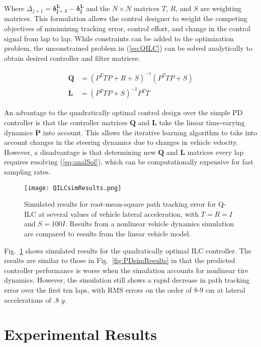 \documentclass[letterpaper, 10 pt, conference]{ieeeconf}  %
\begin{document}
Where $\Delta_{j\!+\!1} = \mathbf{\delta^L_{j\!+\!1}} - \mathbf{\delta^L_{j}}$ and the $N \times N$ matrices $T$, $R$, and $S$ are weighting matrices.
This formulation allows the control designer to weight the competing objectives of minimizing tracking error, control effort, and change in the control signal from lap to lap.
While constraints can be added to the optimization problem, the unconstrained problem in (\ref{eq:QILC}) can be solved analytically \cite{bristow} to obtain desired controller and filter matrices:

\begin{subequations}
\label{eq:analSol}
\begin{align}
	\mathbf{Q} &= (P^TTP + R + S)^{-1}(P^TTP+S)\\
	\mathbf{L} &= (P^TTP + S)^{-1}P^TT
\end{align}
\end{subequations}

An advantage to the quadratically optimal control design over the simple PD controller is that the controller matrices $\mathbf{Q}$ and $\mathbf{L}$ take the linear time-varying dynamics $\mathbf{P}$ into account. This allows the iterative learning algorithm
to take into account changes in the steering dynamics due to changes in vehicle velocity. However, a disadvantage is that determining new $\mathbf{Q}$ and $\mathbf{L}$ matrices every lap
requires resolving (\ref{eq:analSol}), which can be computationally expensive for fast sampling rates. 

\begin{figure}
\centering
\texttt{[image: QILCsimResults.png]}
\caption{Simulated results for root-mean-square path tracking error for Q-ILC at several values of vehicle lateral acceleration, with $T = R = I$ and $S = \mathrm{100} I$. Results from a nonlinear vehicle dynamics simulation are compared to results
from the linear vehicle model.}
\label{fig:QILCsimResults}
\end{figure}

Fig.~\ref{fig:QILCsimResults} shows simulated results for the quadratically optimal ILC controller. The results are similar to those in Fig.~\ref{fig:PDsimResults} in that the predicted controller performance
is worse when the simulation accounts for nonlinear tire dynamics. However, the simulation still shows a rapid decrease in path tracking error over the first ten laps, with RMS errors on the order
of 8-9 cm at lateral accelerations of .8 $g$. 


\section{Experimental Results}
\end{document}
